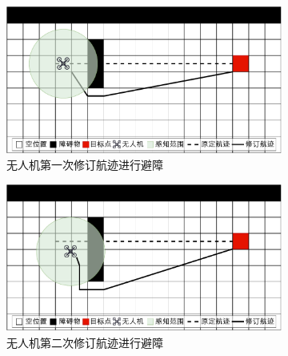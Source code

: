 \begin{figure}[!htbp]
    \centering
    \begin{subfigure}[t]{0.48\textwidth}
        \captionsetup{justification=centering}
        \begin{minipage}[b]{\linewidth}
            \includegraphics[width=\textwidth]{images/单无人机避障步骤示例1.pdf}
            \caption{无人机第一次修订航迹进行避障}
            \label{fig:单无人机第一次修订航迹进行避障}
        \end{minipage}
    \end{subfigure}
    \begin{subfigure}[t]{0.48\textwidth}
        \captionsetup{justification=centering}
        \begin{minipage}[b]{\linewidth}
            \includegraphics[width=\textwidth]{images/单无人机避障步骤示例2.pdf}
            \caption{无人机第二次修订航迹进行避障}
            \label{fig:单无人机第二次修订航迹进行避障}
        \end{minipage}
    \end{subfigure}
    \begin{subfigure}[t]{0.48\textwidth}
        \captionsetup{justification=centering}

\end{subfigure}
\end{figure}
